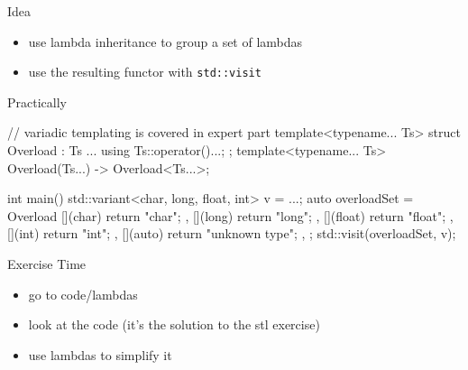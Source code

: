 \begin{frame}[fragile]
  \begin{exampleblock}{Idea}
    \begin{itemize}
    \item use lambda inheritance to group a set of lambdas
    \item use the resulting functor with \texttt{std::visit}
    \end{itemize}
  \end{exampleblock}
  \scriptsize
  \begin{block}{Practically}
    \begin{cppcode*}{}
      // variadic templating is covered in expert part
      template<typename... Ts> struct Overload :
          Ts ... { using Ts::operator()...; };
      template<typename... Ts> Overload(Ts...) -> Overload<Ts...>;

      int main(){
        std::variant<char, long, float, int> v = ...;
        auto overloadSet = Overload {
          [](char) { return "char"; },
          [](long) { return "long"; },
          [](float) { return "float"; },
          [](int) { return "int"; },
          [](auto) { return "unknown type"; },
        };
        std::visit(overloadSet, v);
      }
    \end{cppcode*}
  \end{block}
\end{frame}

\begin{frame}[fragile]
  \begin{alertblock}{Exercise Time}
    \begin{itemize}
    \item go to code/lambdas
    \item look at the code (it's the solution to the stl exercise)
    \item use lambdas to simplify it
    \end{itemize}
  \end{alertblock}
\end{frame}
